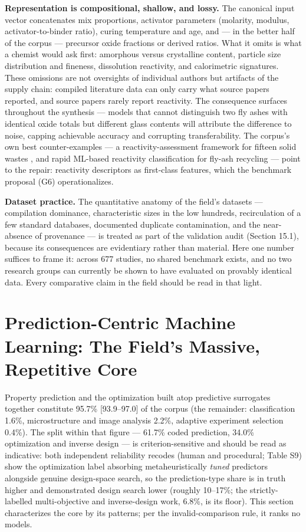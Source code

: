 \documentclass[pdflatex,sn-basic]{sn-jnl}
\begin{document}
\textbf{Representation is compositional, shallow, and lossy.} The canonical input vector concatenates mix proportions, activator parameters (molarity, modulus, activator-to-binder ratio), curing temperature and age, and --- in the better half of the corpus --- precursor oxide fractions or derived ratios. What it omits is what a chemist would ask first: amorphous versus crystalline content, particle size distribution and fineness, dissolution reactivity, and calorimetric signatures. These omissions are not oversights of individual authors but artifacts of the supply chain: compiled literature data can only carry what source papers reported, and source papers rarely report reactivity. The consequence surfaces throughout the synthesis --- models that cannot distinguish two fly ashes with identical oxide totals but different glass contents will attribute the difference to noise, capping achievable accuracy and corrupting transferability. The corpus's own best counter-examples --- a reactivity-assessment framework for fifteen solid wastes \citep{song2025}, and rapid ML-based reactivity classification for fly-ash recycling \citep{qi2022} --- point to the repair: reactivity descriptors as first-class features, which the benchmark proposal (G6) operationalizes.

\textbf{Dataset practice.} The quantitative anatomy of the field's datasets --- compilation dominance, characteristic sizes in the low hundreds, recirculation of a few standard databases, documented duplicate contamination, and the near-absence of provenance --- is treated as part of the validation audit (Section 15.1), because its consequences are evidentiary rather than material. Here one number suffices to frame it: across 677 studies, no shared benchmark exists, and no two research groups can currently be shown to have evaluated on provably identical data. Every comparative claim in the field should be read in that light.

\section{Prediction-Centric Machine Learning: The Field's Massive, Repetitive Core}

Property prediction and the optimization built atop predictive surrogates together constitute 95.7\% [93.9--97.0] of the corpus (the remainder: classification 1.6\%, microstructure and image analysis 2.2\%, adaptive experiment selection 0.4\%). The split within that figure --- 61.7\% coded prediction, 34.0\% optimization and inverse design --- is criterion-sensitive and should be read as indicative: both independent reliability recodes (human and procedural; Table S9) show the optimization label absorbing metaheuristically \emph{tuned} predictors alongside genuine design-space search, so the prediction-type share is in truth higher and demonstrated design search lower (roughly 10--17\%; the strictly-labelled multi-objective and inverse-design work, 6.8\%, is its floor). This section characterizes the core by its patterns; per the invalid-comparison rule, it ranks no models.
\end{document}

